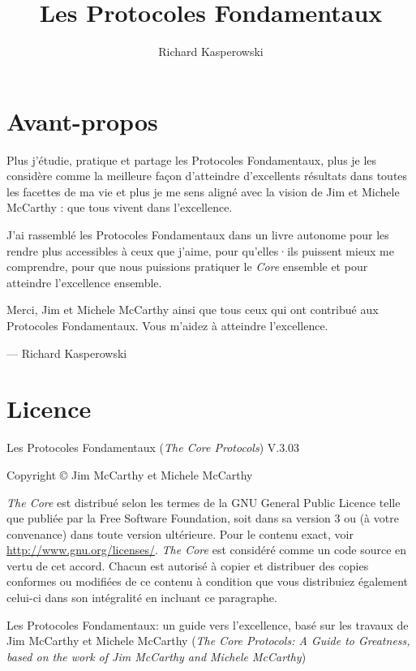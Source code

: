 \documentclass{book}
\author{Richard Kasperowski}
\title{Les Protocoles Fondamentaux}
\begin{document}
\frontmatter

\setcounter{secnumdepth}{1}
\setcounter{tocdepth}{1}
\tableofcontents

\setlength{\parskip}{0.5em}

\chapter{Avant-propos}

Plus j'étudie, pratique et partage les Protocoles Fondamentaux, plus je les considère comme la meilleure façon d'atteindre
d'excellents résultats dans toutes les facettes de ma vie et plus je me sens aligné avec la vision de Jim et Michele McCarthy :
que tous vivent dans l'excellence.

J'ai rassemblé les Protocoles Fondamentaux dans un livre autonome pour les rendre plus accessibles à ceux que j'aime, pour 
qu'elles·ils puissent mieux me comprendre, pour que nous puissions pratiquer le \emph{Core} ensemble et pour atteindre
l'excellence ensemble.

Merci, Jim et Michele McCarthy ainsi que tous ceux qui ont contribué aux Protocoles Fondamentaux. Vous m'aidez à atteindre
l'excellence.

--- Richard Kasperowski


\chapter{Licence}

Les Protocoles Fondamentaux (\emph{The Core Protocols}) V.3.03

Copyright \copyright{} Jim McCarthy et Michele McCarthy

\emph{The Core} est distribué selon les termes de la GNU General Public Licence telle que publiée par la Free Software 
Foundation, soit dans sa version 3 ou (à votre convenance) dans toute version ultérieure. Pour le contenu exact, voir
\url{http://www.gnu.org/licenses/}. \emph{The Core} est considéré comme un code source en vertu de cet accord. Chacun est autorisé
à copier et distribuer des copies conformes ou modifiées de ce contenu à condition que vous distribuiez également celui-ci
dans son intégralité en incluant ce paragraphe. 

Les Protocoles Fondamentaux: un guide vers l'excellence, basé sur les travaux de Jim McCarthy et Michele McCarthy 
(\emph{The Core Protocols: A Guide to Greatness, based on the work of Jim McCarthy and Michele McCarthy})
\end{document}
